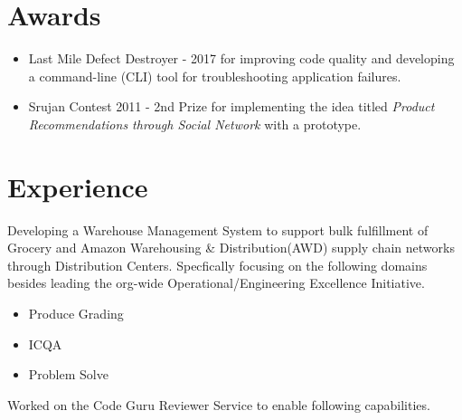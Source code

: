 \documentclass[10pt]{article}
\begin{document}
\begin{minipage}[t]{0.40\textwidth}
\section*{Awards}
\begin{itemize}
\item Last Mile Defect Destroyer - 2017 for improving code quality and developing a command-line (CLI) tool for troubleshooting application failures.
\item Srujan Contest 2011 - 2nd Prize for implementing the idea titled {\sl Product Recommendations through Social Network} with a prototype. 
\end{itemize}

\end{minipage}
\hfill
\begin{minipage}[t]{0.58\textwidth}
\vspace{5pt}
\section*{Experience}
\begin{flushright}


\RaggedRight Developing a Warehouse Management System to support bulk fulfillment of Grocery and Amazon Warehousing \& Distribution(AWD) supply chain networks through Distribution Centers. Specfically focusing on the following domains besides leading the org-wide Operational/Engineering Excellence Initiative.
\begin{itemize}
\item {Produce Grading}
\item ICQA
\item {Problem Solve}
\end{itemize}

\RaggedRight Worked on the Code Guru Reviewer Service to enable following capabilities.


\end{flushright}
\end{minipage}
\end{document}
